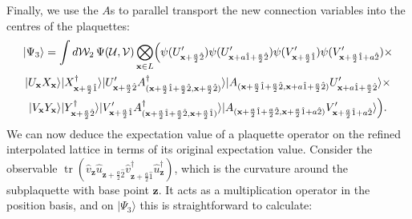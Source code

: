 \documentclass[12pt]{amsart}
\newcommand{\tr}{\operatorname{tr}}
\theoremstyle{definition}
\theoremstyle{remark}
\numberwithin{equation}{section}
\begin{document}
Finally, we use the $A$s to parallel transport the new connection variables into the centres of the plaquettes:
\begin{multline}	
	|\Psi_3\rangle = \int  d\mathcal{W}_2 \, \Psi(\mathcal{U},\mathcal{V}) \bigotimes_{\mathbf{x}\in L}\Bigl( \psi(U_{\mathbf{x}+\frac{a}{2}\hat{2}}')\psi(U_{\mathbf{x}+{a}\hat{1}+\frac{a}{2}\hat{2}}')\psi(V_{\mathbf{x}+\frac{a}{2}\hat{1}}')\psi(V_{\mathbf{x}+\frac{a}{2}\hat{1}+{a}\hat{2}}') \times\\ 
	|U_\mathbf{x} X_\mathbf{x}\rangle|X^\dag_{\mathbf{x}+\frac{a}{2}\hat{1}}\rangle |U_{\mathbf{x}+\frac{a}{2}\hat{2}}' A_{(\mathbf{x}+\frac{a}{2}\hat{1}+\frac{a}{2}\hat{2}, \mathbf{x}+\frac{a}{2}\hat{2})}^\dag   \rangle|A_{(\mathbf{x}+\frac{a}{2}\hat{1}+\frac{a}{2}\hat{2}, \mathbf{x}+{a}\hat{1}+\frac{a}{2}\hat{2})}U_{\mathbf{x}+{a}\hat{1}+\frac{a}{2}\hat{2}}'\rangle \times \\ 
	|V_\mathbf{x} Y_\mathbf{x}\rangle|Y^\dag_{\mathbf{x}+\frac{a}{2}\hat{2}}\rangle|V_{\mathbf{x}+\frac{a}{2}\hat{1}}'A_{(\mathbf{x}+\frac{a}{2}\hat{1}+\frac{a}{2}\hat{2}, \mathbf{x}+\frac{a}{2}\hat{1})}^\dag\rangle |A_{(\mathbf{x}+\frac{a}{2}\hat{1}+\frac{a}{2}\hat{2}, \mathbf{x}+\frac{a}{2}\hat{1}+{a}\hat{2})}V_{\mathbf{x}+\frac{a}{2}\hat{1}+{a}\hat{2}}'\rangle \Bigr).
\end{multline}
We can now deduce the expectation value of a plaquette operator on the refined interpolated lattice in terms of its original expectation value. Consider the observable $\tr(\widehat{v}_{\mathbf{z}}\widehat{u}_{\mathbf{z}+\frac{a}{2}\hat{2}}\widehat{v}^\dag_{\mathbf{z}+\frac{a}{2}\hat{1}}\widehat{u}_{\mathbf{z}}^\dag)$, which is the curvature around the subplaquette with base point $\mathbf{z}$. It acts as a multiplication operator in the position basis, and on $|\Psi_3\rangle$ this is straightforward to calculate:
\end{document}
